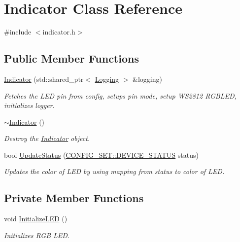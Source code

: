 \hypertarget{classIndicator}{}\section{Indicator Class Reference}
\label{classIndicator}


{\ttfamily \#include $<$indicator.\+h$>$}

\subsection*{Public Member Functions}
\begin{DoxyCompactItemize}
\item 
\hyperlink{classIndicator_a88d17656c2aa4c8e16c3b98176318837}{Indicator} (std\+::shared\+\_\+ptr$<$ \hyperlink{classLogging}{Logging} $>$ \&logging)
\begin{DoxyCompactList}\small\item\em Fetches the L\+ED pin from config, setups pin mode, setup W\+S2812 R\+G\+B\+L\+ED, initializes logger. \end{DoxyCompactList}\item 
\hyperlink{classIndicator_a8099ca10ae3ae131b0423899f1abb61c}{$\sim$\+Indicator} ()
\begin{DoxyCompactList}\small\item\em Destroy the \hyperlink{classIndicator}{Indicator} object. \end{DoxyCompactList}\item 
bool \hyperlink{classIndicator_a877e11943c90a02cc1a85a4d4ac3136c}{Update\+Status} (\hyperlink{namespaceCONFIG__SET_a8379cbe9f81ee38829b156f47261081a}{C\+O\+N\+F\+I\+G\+\_\+\+S\+E\+T\+::\+D\+E\+V\+I\+C\+E\+\_\+\+S\+T\+A\+T\+US} status)
\begin{DoxyCompactList}\small\item\em Updates the color of L\+ED by using mapping from status to color of L\+ED. \end{DoxyCompactList}\end{DoxyCompactItemize}
\subsection*{Private Member Functions}
\begin{DoxyCompactItemize}
\item 
void \hyperlink{classIndicator_ad5b03db5e614c409d69742bb6ec76ec9}{Initialize\+L\+ED} ()
\begin{DoxyCompactList}\small\item\em Initializes R\+GB L\+ED. \end{DoxyCompactList}\end{DoxyCompactItemize}
